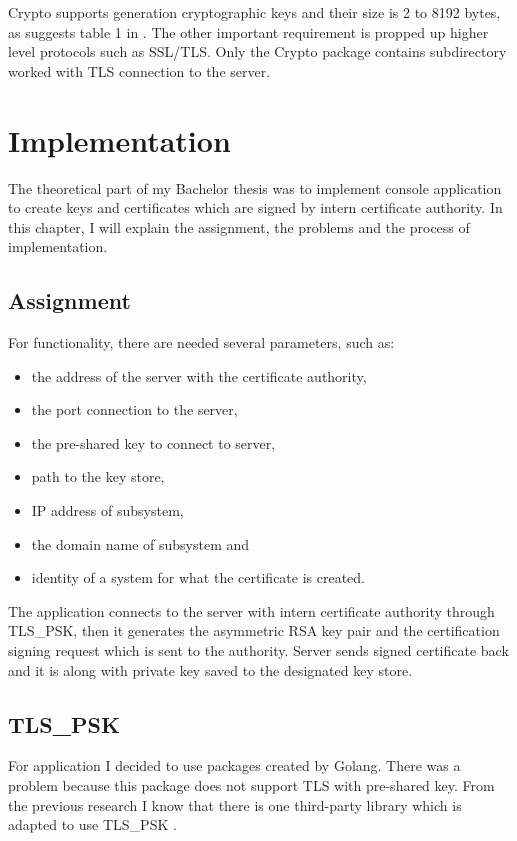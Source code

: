 \documentclass[
  digital, %
  notable,   %
  lof,     %
  lot,     %
]{fithesis3}
\begin{document}
Crypto supports generation cryptographic keys and their size is 2 to 8192 bytes, as suggests table 
1 in \cite{hinek2008security}. The other important requirement is propped up higher level 
protocols such as SSL/TLS. Only the Crypto package contains subdirectory worked with TLS 
connection to the server.

\chapter{Implementation}
The theoretical part of my Bachelor thesis was to implement console application to create keys and 
certificates which are signed by intern certificate authority. In this chapter, I will explain the 
assignment, the problems and the process of implementation. 

\section{Assignment}
For functionality, there are needed several parameters, such as:
\begin{itemize}[leftmargin=2em,rightmargin=1em,itemsep=0.75\parskip,parsep=0em,topsep=0em,partopsep=0em]
\item the address of the server with the certificate authority,
\item the port connection to the server,
\item the pre-shared key to connect to server,
\item path to the key store,
\item IP address of subsystem,
\item the domain name of subsystem and 
\item identity of a system for what the certificate is created.
\end{itemize}
\vskip 0.1in
The application connects to the server with intern certificate authority through 
TLS\_PSK, then it generates the asymmetric RSA key pair and the certification signing 
request which is sent to the authority. Server sends signed certificate back and it is 
along with private key saved to the designated key store.

\section{TLS\_PSK}
For application I decided to use packages created by Golang. There was a problem 
because this package does not support TLS with pre-shared key. From the previous 
research I know that there is one third-party library which is adapted to use TLS\_PSK 
\cite{raff}. 
\end{document}

